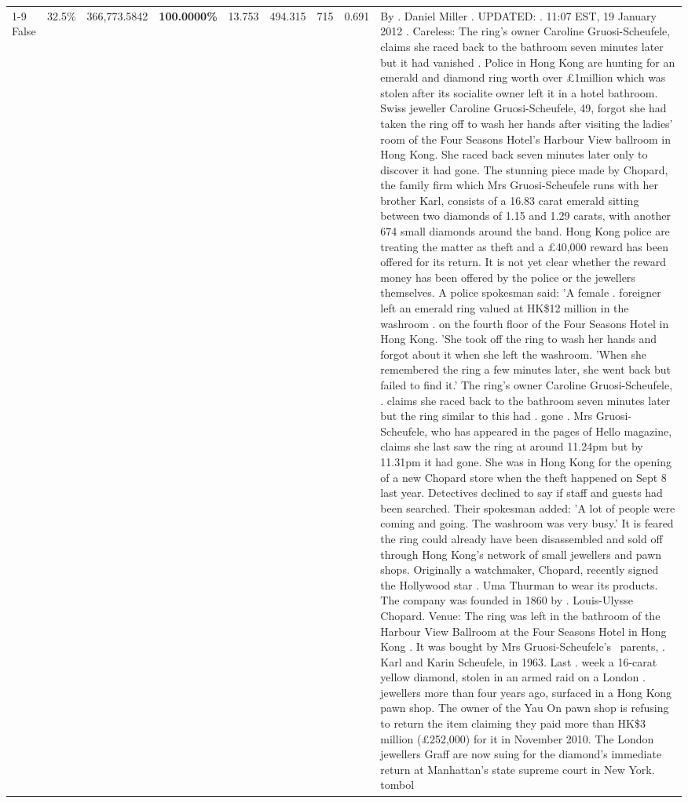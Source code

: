 \begin{table}[H]
\begin{tabular}{lllrlllll}
\cline{1-9}
False & 32.5\% & 366,773.5842 & \bfseries \color{red} 100.0000\% & 13.753 & 494.315 & 715 & 0.691 & By . Daniel Miller . UPDATED: . 11:07 EST, 19 January 2012 . Careless: The ring's owner Caroline Gruosi-Scheufele, claims she raced back to the bathroom seven minutes later but it had vanished . Police in Hong Kong are hunting for an emerald and diamond ring worth over £1million which was stolen after its socialite owner left it in a hotel bathroom. Swiss jeweller Caroline Gruosi-Scheufele, 49, forgot she had taken the ring off to wash her hands after visiting the ladies' room of the Four Seasons Hotel's Harbour View ballroom in Hong Kong. She raced back seven minutes later only to discover it had gone. The stunning piece made by Chopard, the family firm which Mrs Gruosi-Scheufele runs with her brother Karl, consists of a 16.83 carat emerald sitting between two diamonds of 1.15 and 1.29 carats, with another 674 small diamonds around the band. Hong Kong police are treating the matter as theft and a £40,000 reward has been offered for its return. It is not yet clear whether the reward money has been offered by the police or the jewellers themselves. A police spokesman said: 'A female . foreigner left an emerald ring valued at HK\$12 million in the washroom . on the fourth floor of the Four Seasons Hotel in Hong Kong. 'She took off the ring to wash her hands and forgot about it when she left the washroom. 'When she remembered the ring a few minutes later, she went back but failed to find it.' The ring's owner Caroline Gruosi-Scheufele, . claims she raced back to the bathroom seven minutes later but the ring similar to this had . gone . Mrs Gruosi-Scheufele, who has appeared in the pages of Hello magazine, claims she last saw the ring at around 11.24pm but by 11.31pm it had gone. She was in Hong Kong for the opening of a new Chopard store when the theft happened on Sept 8 last year. Detectives declined to say if staff and guests had been searched. Their spokesman added: 'A lot of people were coming and going. The washroom was very busy.' It is feared the ring could already have been disassembled and sold off through Hong Kong's network of small jewellers and pawn shops. Originally a watchmaker, Chopard, recently signed the Hollywood star . Uma Thurman to wear its products. The company was founded in 1860 by . Louis-Ulysse Chopard. Venue: The ring was left in the bathroom of the Harbour View Ballroom at the Four Seasons Hotel in Hong Kong . It was bought by Mrs Gruosi-Scheufele's  parents, . Karl and Karin Scheufele, in 1963. Last . week a 16-carat yellow diamond, stolen in an armed raid on a London . jewellers more than four years ago, surfaced in a Hong Kong pawn shop. The owner of the Yau On pawn shop is refusing to return the item claiming they paid more than HK\$3 million (£252,000) for it in November 2010. The London jewellers Graff are now suing for the diamond’s immediate return at Manhattan’s state supreme court in New York. tombol \\

\end{tabular}
\end{table}
